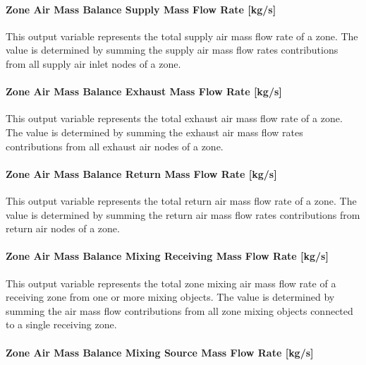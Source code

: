 \paragraph{Zone Air Mass Balance Supply Mass Flow Rate {[}kg/s{]}}\label{zone-air-mass-balance-supply-mass-flow-rate-kgs}

This output variable represents the total supply air mass flow rate of a zone. The value is determined by summing the supply air mass flow rates contributions from all supply air inlet nodes of a zone.

\paragraph{Zone Air Mass Balance Exhaust Mass Flow Rate {[}kg/s{]}}\label{zone-air-mass-balance-exhaust-mass-flow-rate-kgs}

This output variable represents the total exhaust air mass flow rate of a zone. The value is determined by summing the exhaust air mass flow rates contributions from all exhaust air nodes of a zone.

\paragraph{Zone Air Mass Balance Return Mass Flow Rate {[}kg/s{]}}\label{zone-air-mass-balance-return-mass-flow-rate-kgs}

This output variable represents the total return air mass flow rate of a zone. The value is determined by summing the return air mass flow rates contributions from return air nodes of a zone.

\paragraph{Zone Air Mass Balance Mixing Receiving Mass Flow Rate {[}kg/s{]}}\label{zone-air-mass-balance-mixing-receiving-mass-flow-rate-kgs}

This output variable represents the total zone mixing air mass flow rate of a receiving zone from one or more mixing objects. The value is determined by summing the air mass flow contributions from all zone mixing objects connected to a single receiving zone.

\paragraph{Zone Air Mass Balance Mixing Source Mass Flow Rate {[}kg/s{]}}\label{zone-air-mass-balance-mixing-source-mass-flow-rate-kgs}

